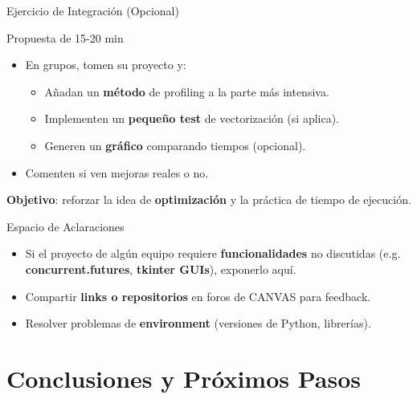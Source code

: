 \documentclass[10pt]{beamer}
\begin{document}
\begin{frame}{Ejercicio de Integración (Opcional)}
  \begin{block}{Propuesta de 15-20 min}
    \begin{itemize}
      \item En grupos, tomen su proyecto y:
        \begin{itemize}
          \item Añadan un \textbf{método} de profiling a la parte más intensiva.
          \item Implementen un \textbf{pequeño test} de vectorización (si aplica).
          \item Generen un \textbf{gráfico} comparando tiempos (opcional).
        \end{itemize}
      \item Comenten si ven mejoras reales o no.
    \end{itemize}
  \end{block}
  \textbf{Objetivo}: reforzar la idea de \textbf{optimización} y la práctica de tiempo de ejecución.
\end{frame}

\begin{frame}{Espacio de Aclaraciones}
  \begin{itemize}
    \item Si el proyecto de algún equipo requiere \textbf{funcionalidades} no discutidas (e.g. \textbf{concurrent.futures}, \textbf{tkinter GUIs}), exponerlo aquí.
    \item Compartir \textbf{links o repositorios} en foros de CANVAS para feedback.
    \item Resolver problemas de \textbf{environment} (versiones de Python, librerías).
  \end{itemize}
\end{frame}

\section{Conclusiones y Próximos Pasos}
\end{document}
